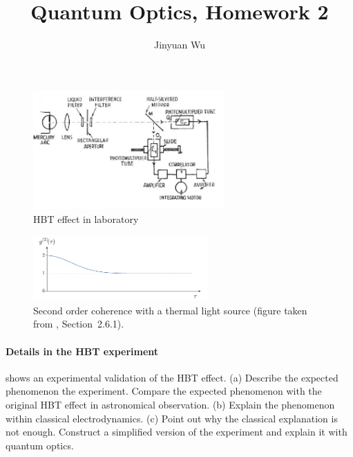 \documentclass[hyperref, a4paper]{article}
\title{Quantum Optics, Homework 2}
\author{Jinyuan Wu}
\begin{document}
\maketitle

\begin{figure}
    \centering
    \includegraphics[width=0.65\textwidth]{hbt-lab.png}
    \caption{HBT effect in laboratory}
    \label{fig:hbt-lab}
\end{figure}

\begin{figure}
    \centering
    \includegraphics[width=0.6\textwidth]{thermal-state-g2.PNG}
    \caption{Second order coherence with a thermal light source (figure taken from \cite{optical-note-steck}, Section~2.6.1).}
    \label{fig:thermal-hbt}
\end{figure}

\paragraph{Details in the HBT experiment}  shows an experimental validation of the HBT effect. 
(a) Describe the expected phenomenon the experiment. Compare the expected phenomenon with the original HBT effect in astronomical observation.
(b) Explain the phenomenon within classical electrodynamics.
(c) Point out why the classical explanation is not enough. Construct a simplified version of the experiment and explain it with quantum optics.
\end{document}

